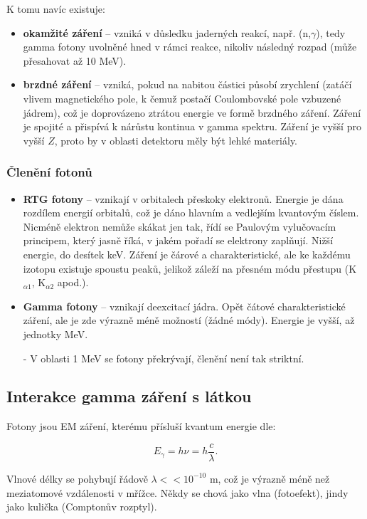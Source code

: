 K tomu navíc existuje:

\begin{itemize}
    \item \textbf{okamžité záření} -- vzniká v důsledku jaderných reakcí, např. (n,$\gamma$), tedy gamma fotony uvolněné hned v rámci reakce, nikoliv následný rozpad (může přesahovat až 10 MeV).
    \item \textbf{brzdné záření} -- vzniká, pokud na nabitou částici působí zrychlení (zatáčí vlivem magnetického pole, k čemuž postačí Coulombovské pole vzbuzené jádrem), což je doprovázeno ztrátou energie ve formě brzdného záření. Záření je spojité a přispívá k nárůstu kontinua v gamma spektru. Záření je vyšší pro vyšší $Z$, proto by v oblasti detektoru měly být lehké materiály.
\end{itemize}

\subsubsection{Členění fotonů}

\begin{itemize}
    \item \textbf{RTG fotony} -- vznikají v orbitalech přeskoky elektronů. Energie je dána rozdílem energií orbitalů, což je dáno hlavním a vedlejším kvantovým číslem. Nicméně elektron nemůže skákat jen tak, řídí se Paulovým vylučovacím principem, který jasně říká, v jakém pořadí se elektrony zaplňují. Nižší energie, do desítek keV. Záření je čárové a charakteristické, ale ke každému izotopu existuje spoustu peaků, jelikož záleží na přesném módu přestupu (K$_{\alpha1}$, K$_{\alpha2}$ apod.).
    \item \textbf{Gamma fotony} -- vznikají deexcitací jádra. Opět čátové charakteristické záření, ale je zde výrazně méně možností (žádné módy). Energie je vyšší, až jednotky MeV.
    \item[-] V oblasti 1 MeV se fotony překrývají, členění není tak striktní.
\end{itemize}

\subsection{Interakce gamma záření s látkou}

Fotony jsou EM záření, kterému přísluší kvantum energie dle:

$$ E_\gamma = h \nu = h \dfrac{c}{\lambda}. $$

Vlnové délky se pohybují řádově $\lambda << 10^{-10}$ m, což je výrazně méně než meziatomové vzdálenosti v mřížce. Někdy se chová jako vlna (fotoefekt), jindy jako kulička (Comptonův rozptyl).

